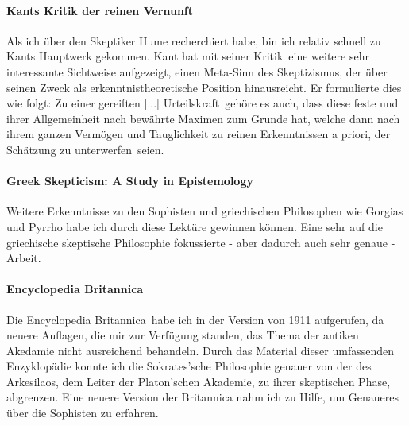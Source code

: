 \documentclass[12pt,a4paper,final]{article}
\begin{document}
\paragraph{Kants \glqq Kritik der reinen Vernunft\grqq\ \cite{kritik}} Als ich über den Skeptiker Hume recherchiert habe, bin ich relativ schnell zu Kants Hauptwerk gekommen. Kant hat mit seiner \glqq Kritik\grqq\ eine weitere sehr interessante Sichtweise aufgezeigt, einen Meta-Sinn des Skeptizismus, der über seinen Zweck als erkenntnistheoretische Position hinausreicht. Er formulierte dies wie folgt: Zu einer \glqq gereiften [...] Urteilskraft\grqq\ gehöre es auch, dass diese \glqq feste und ihrer Allgemeinheit nach bewährte Maximen zum Grunde hat\grqq, welche dann \glqq nach ihrem ganzen Vermögen und Tauglichkeit zu reinen Erkenntnissen a priori, der Schätzung zu unterwerfen\grqq\ seien.
%
\paragraph*{Greek Skepticism: A Study in Epistemology \cite{greek_stough}} Weitere Erkenntnisse zu den Sophisten und griechischen Philosophen wie Gorgias und Pyrrho habe ich durch diese Lektüre gewinnen können. Eine sehr auf die griechische skeptische Philosophie fokussierte - aber dadurch auch sehr genaue - Arbeit.
%
\paragraph*{Encyclopedia Britannica \cite{enc_brit_sophist,enc_brit_acad}} Die \glqq Encyclopedia Britannica\grqq\ habe ich in der Version von 1911 aufgerufen, da neuere Auflagen, die mir zur Verfügung standen, das Thema der antiken Akedamie nicht ausreichend behandeln. Durch das Material dieser umfassenden Enzyklopädie konnte ich die Sokrates'sche Philosophie genauer von der des Arkesilaos, dem Leiter der Platon'schen Akademie, zu ihrer skeptischen Phase, abgrenzen. Eine neuere Version der Britannica nahm ich zu Hilfe, um Genaueres über die Sophisten zu erfahren.
%
\nocite{*}
\pagebreak
\printbibliography
\end{document}
